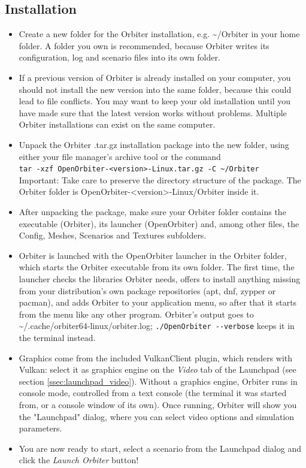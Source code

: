 \documentclass[Orbiter User Manual.tex]{subfiles}
\begin{document}
\subsection{Installation}
\begin{itemize}
\item Create a new folder for the Orbiter installation, e.g. \textasciitilde/Orbiter in your home folder. A folder you own is recommended, because Orbiter writes its configuration, log and scenario files into its own folder.
\item If a previous version of Orbiter is already installed on your computer, you should not install the new version into the same folder, because this could lead to file conflicts. You may want to keep your old installation until you have made sure that the latest version works without problems. Multiple Orbiter installations can exist on the same computer.
\item Unpack the Orbiter .tar.gz installation package into the new folder, using either your file manager's archive tool or the command\\
\texttt{tar -xzf OpenOrbiter-<version>-Linux.tar.gz -C \textasciitilde/Orbiter}\\
Important: Take care to preserve the directory structure of the package. The Orbiter folder is OpenOrbiter-<version>-Linux/Orbiter inside it.
\item After unpacking the package, make sure your Orbiter folder contains the executable (Orbiter), its launcher (OpenOrbiter) and, among other files, the Config, Meshes, Scenarios and Textures subfolders.
\item Orbiter is launched with the OpenOrbiter launcher in the Orbiter folder, which starts the Orbiter executable from its own folder. The first time, the launcher checks the libraries Orbiter needs, offers to install anything missing from your distribution's own package repositories (apt, dnf, zypper or pacman), and adds Orbiter to your application menu, so after that it starts from the menu like any other program. Orbiter's output goes to \textasciitilde/.cache/orbiter64-linux/orbiter.log; \texttt{./OpenOrbiter -{}-verbose} keeps it in the terminal instead.
\item Graphics come from the included VulkanClient plugin, which renders with Vulkan: select it as graphics engine on the \textit{Video} tab of the Launchpad (see section \ref{ssec:launchpad_video}). Without a graphics engine, Orbiter runs in console mode, controlled from a text console (the terminal it was started from, or a console window of its own). Once running, Orbiter will show you the "Launchpad" dialog, where you can select video options and simulation parameters.
\item You are now ready to start, select a scenario from the Launchpad dialog and click the \textit{Launch Orbiter} button!
\end{itemize}
\end{document}
